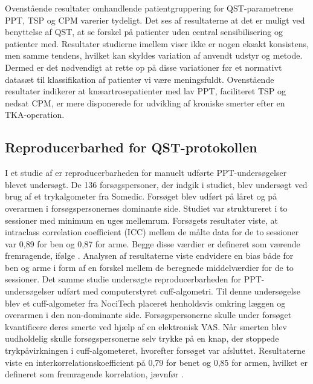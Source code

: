 Ovenstående resultater omhandlende patientgruppering for QST-parametrene PPT, TSP og
CPM varerier tydeligt. Det ses af resultaterne at det er muligt ved benyttelse af QST, at se
forskel på patienter uden central sensibilisering og patienter med. Resultater studierne imellem viser ikke er nogen eksakt konsistens, men samme tendens, hvilket kan skyldes variation af anvendt udstyr og metode. Dermed er det nødvendigt at rette op på disse variationer før et normativt datasæt til klassifikation af patienter vi være meningsfuldt. Ovenstående resultater indikerer at knæartrosepatienter med lav PPT, faciliteret TSP og nedsat CPM, er mere disponerede for udvikling af kroniske smerter efter en TKA-operation.

\subsection{Reproducerbarhed for QST-protokollen}
\label{sec_rep}
I et studie af  er reproducerbarheden for manuelt udførte PPT-undersøgelser blevet undersøgt. De 136 forsøgspersoner, der indgik i studiet, blev undersøgt ved brug af et trykalgometer fra Somedic. Forsøget blev udført på låret og på overarmen i forsøgspersonernes dominante side. Studiet var struktureret i to sessioner med minimum en uges mellemrum. Forsøgets resultater viste, at intraclass correlation coefficient (ICC) mellem de målte data for de to sessioner var 0,89 for ben og 0,87 for arme. Begge disse værdier er defineret som værende fremragende, ifølge . Analysen af resultaterne viste endvidere en bias både for ben og arme i form af en forskel mellem de beregnede middelværdier for de to sessioner. Det samme studie undersøgte reproducerbarheden for PPT-undersøgelser udført med computerstyret cuff-algometri. Til denne undersøgelse blev et cuff-algometer fra NociTech placeret henholdsvis omkring læggen og overarmen i den non-dominante side. Forsøgspersonerne skulle under forsøget kvantificere deres smerte ved hjælp af en elektronisk VAS. Når smerten blev uudholdelig skulle forsøgspersonerne selv trykke på en knap, der stoppede trykpåvirkningen i cuff-algometeret, hvorefter forsøget var afsluttet. Resultaterne viste en interkorrelationskoefficient på 0,79 for benet og 0,85 for armen, hvilket er defineret som fremragende korrelation, jævnfør . \citep{Nielsen2015}

